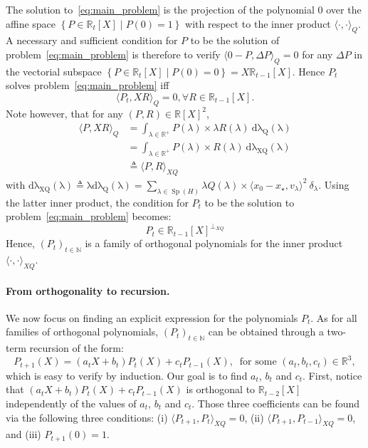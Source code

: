 \documentclass{article}
\def\Sp{\operatorname{Sp}}
\newcommand{\xs}{x_\star}
\begin{document}
        The solution to~\cref{eq:main_problem} is the projection of the polynomial $0$ over the affine space
        $\left\{ P\in\mathbb{R}_t[X] \mid P(0)=1 \right\}$ with respect to the inner product $\langle \cdot, \cdot\rangle_Q$.
        A necessary and sufficient condition for $P$ to be the solution of problem~\cref{eq:main_problem} is therefore
        to verify $\langle 0-P, \Delta P \rangle_Q=0$ for any $\Delta P$ in the vectorial subspace
        $\left\{ P\in\mathbb{R}_t[X] \mid P(0)=0 \right\}=X\mathbb{R}_{t-1}[X]$.
        Hence $P_t$ solves problem~\cref{eq:main_problem} iff
        \begin{equation}
            \langle P_t, XR \rangle_Q=0, \forall R\in\mathbb{R}_{t-1}[X].
        \end{equation}
        Note however, that for any $(P, R)\in\mathbb{R}[X]^2$,
        \begin{align*}
            \langle P, XR \rangle_Q
            & = \displaystyle\int_{\lambda\in \mathbb{R}^+} P(\lambda) \times \lambda R(\lambda) ~ \mathrm{d\lambda_Q(\lambda)} \\
            & = \displaystyle\int_{\lambda\in \mathbb{R}^+} P(\lambda) \times R(\lambda) ~ \mathrm{d\lambda_{XQ}(\lambda)} \\
            & \triangleq \langle P, R \rangle_{XQ}
        \end{align*}
        with $\mathrm{d\lambda_{XQ}(\lambda)} \triangleq \mathrm{\lambda d\lambda_{Q}(\lambda)}
        = \displaystyle \sum_{\lambda\in \Sp(H)} \lambda Q(\lambda) \times \langle x_0 - \xs, v_{\lambda} \rangle^2 ~ \delta_{\lambda}$.
        Using the latter inner product, the condition for $P_t$ to be the solution to problem~\cref{eq:main_problem} becomes:
        \begin{equation}
            P_t \in \mathbb{R}_{t-1}[X]^{\perp_{XQ}}
        \end{equation}
        Hence, $(P_t)_{t\in\mathbb{N}}$ is a family of orthogonal polynomials for the inner product $\langle \cdot, \cdot \rangle_{XQ}$.

    \paragraph{From orthogonality to recursion.}
        We now focus on finding an explicit expression for the polynomials $P_t$.
        As for all families of orthogonal polynomials, $(P_t)_{t\in\mathbb{N}}$ can be obtained through a
        two-term recursion of the form:
        \begin{equation}
            P_{t+1}(X) = (a_t X + b_t) P_t(X) + c_t P_{t-1}(X), ~\text{ for some } (a_t, b_t, c_t)\in\mathbb{R}^3, \label{eq:3_terms_recursion}
        \end{equation}
        which is easy to verify by induction.
        Our goal is to find $a_t$, $b_t$ and $c_t$.
        First, notice that $(a_t X + b_t) P_t(X) + c_t P_{t-1}(X)$ is orthogonal to $\mathbb{R}_{t-2}[X]$ independently of the values of $a_t$, $b_t$ and $c_t$.
        Those three coefficients can be found via the following  three conditions: (i)
        $\langle P_{t+1}, P_t \rangle_{XQ} = 0$, (ii)
        $\langle P_{t+1}, P_{t-1} \rangle_{XQ} = 0$, and (iii) $P_{t+1}(0)=1$.
\end{document}
